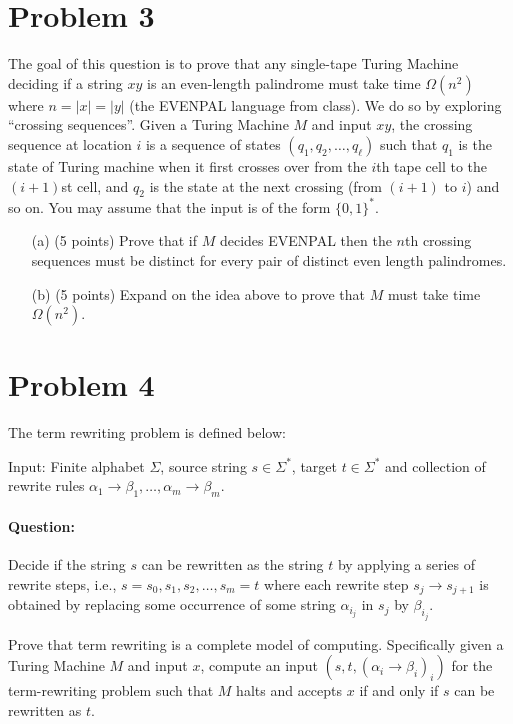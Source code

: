 \documentclass[12pt]{article}
\begin{document}
\section*{Problem 3}

The goal of this question is to prove that any single-tape Turing Machine deciding if a string $xy$ is an even-length palindrome must take time $\Omega(n^2)$ where $n = |x| = |y|$ (the \textsf{EVENPAL} language from class).  We do so by exploring ``crossing sequences''. Given a Turing Machine $M$ and input $xy$, the crossing sequence at location $i$ is a sequence of states $(q_1,q_2,\ldots,q_\ell)$ such that $q_1$ is the state of Turing machine when it first crosses over from the $i$th tape cell to the $(i+1)$st cell, and $q_2$ is the state at the next
crossing (from $(i+1)$ to $i$) and so on. You may assume that the input is of the form $\{0,1\}^*$.

\begin{itemize}
\item[(a)] (5 points)  Prove that if $M$ decides \textsf{EVENPAL} then the $n$th crossing sequences must be distinct for every pair of distinct even length palindromes.
\item[(b)] (5 points) Expand on the idea above to prove that $M$ must take time $\Omega(n^2)$.
\end{itemize}



\section*{Problem 4}

The term rewriting problem is defined below:

Input: Finite alphabet $\Sigma$, source string $s \in \Sigma^*$, target $t \in \Sigma^*$ and collection of rewrite rules $\alpha_1 \to \beta_1, \ldots, \alpha_m \to \beta_m$.\\

\paragraph{Question:} Decide if the string $s$ can be rewritten as the string $t$ by applying a series of rewrite steps, i.e., $s = s_0,s_1,s_2,\ldots,s_m = t$ where each rewrite step $s_j \to s_{j+1}$
is obtained by replacing some occurrence of some string $\alpha_{i_j}$ in $s_j$ by $\beta_{i_j}$.

Prove that term rewriting is a complete model of computing. Specifically given a Turing Machine $M$ and input $x$, compute an input $(s,t,(\alpha_i \to \beta_i)_i)$ for the term-rewriting problem such that $M$ halts and accepts $x$ if and only if $s$ can be rewritten as $t$.
\end{document}
